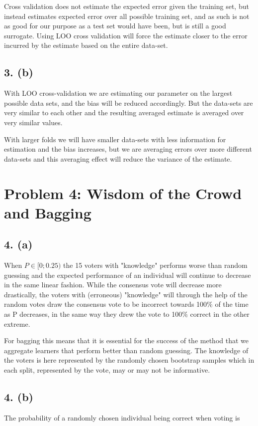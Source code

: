 \documentclass[a4paper, 10pt, english]{article}
\begin{document}
Cross validation does not estimate the expected error given the training set, but instead estimates expected
error over all possible training set, and as such is not as good for our purpose as a test set would have
been, but is still a good surrogate. Using LOO cross validation will force the estimate closer to the error
incurred by the estimate based on the entire data-set.

\subsection{3. (b)}
With LOO cross-validation we are estimating our parameter on the largest possible data sets, and the bias will
be reduced accordingly. But the data-sets are very similar to each other and the resulting averaged estimate
is averaged over very similar values.

With larger folds we will have smaller data-sets with less information for estimation and the bias increases,
but we are averaging errors over more different data-sets and this averaging effect will reduce the variance
of the estimate.


\section{Problem 4: Wisdom of the Crowd and Bagging}

\subsection{4. (a)}
When $P \in [0 ; 0.25)$ the 15 voters with "knowledge" performs worse than random guessing and the expected
performance of an individual will continue to decrease in the same linear fashion.
While the consensus vote will decrease more drastically, the voters with (erroneous) "knowledge" will through
the help of the random votes draw the consensus vote to be incorrect towards 100\% of the time as P decreases,
in the same way they drew the vote to 100\% correct in the other extreme.

For bagging this means that it is essential for the success of the method that we aggregate learners that
perform better than random guessing. The knowledge of the voters is here represented by the randomly chosen
bootstrap samples which in each split, represented by the vote, may or may not be informative.

\subsection{4. (b)}
The probability of a randomly chosen individual being correct when voting is
\end{document}
